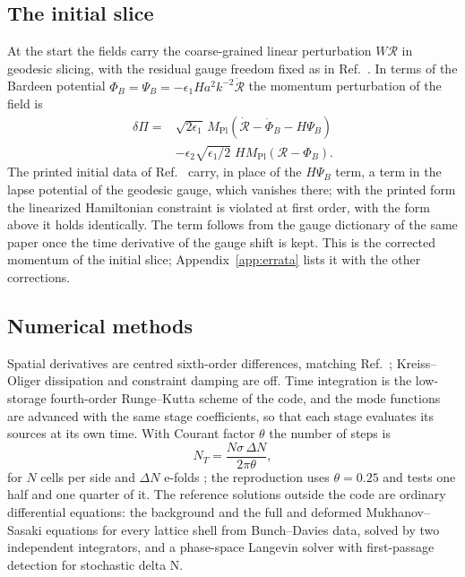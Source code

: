 \documentclass[aps,prd,twocolumn,10pt,superscriptaddress,nofootinbib,longbibliography,floatfix]{revtex4-2}
\newcommand{\Mpl}{M_\mathrm{Pl}}
\begin{document}
\subsection{The initial slice}\label{sec:slice}

At the start the fields carry the coarse-grained linear perturbation $W\mathcal{R}$ in geodesic slicing, with the residual gauge freedom fixed as in Ref.~\cite{Launay:2025bd}. In terms of the Bardeen potential $\Phi_B=\Psi_B=-\epsilon_1Ha^2k^{-2}\dot{\mathcal{R}}$ the momentum perturbation of the field is
\begin{equation}\label{eq:dPi}
\begin{split}
\delta\Pi={}&\sqrt{2\epsilon_1}\,\Mpl\left(\dot{\mathcal{R}}-\dot\Phi_B-H\Psi_B\right)\\
&-\epsilon_2\sqrt{\epsilon_1/2}\;H\Mpl\left(\mathcal{R}-\Phi_B\right).
\end{split}
\end{equation}
The printed initial data of Ref.~\cite{Launay:2025bd} carry, in place of the $H\Psi_B$ term, a term in the lapse potential of the geodesic gauge, which vanishes there; with the printed form the linearized Hamiltonian constraint is violated at first order, with the form above it holds identically. The term follows from the gauge dictionary of the same paper once the time derivative of the gauge shift is kept. This is the corrected momentum of the initial slice; Appendix~\ref{app:errata} lists it with the other corrections.

\subsection{Numerical methods}\label{sec:methods}

Spatial derivatives are centred sixth-order differences, matching Ref.~\cite{Launay:2025sinr}; Kreiss--Oliger dissipation and constraint damping are off. Time integration is the low-storage fourth-order Runge--Kutta scheme of the code, and the mode functions are advanced with the same stage coefficients, so that each stage evaluates its sources at its own time. With Courant factor $\theta$ the number of steps is
\begin{equation}\label{eq:steps}
N_T=\frac{N\sigma\,\Delta N}{2\pi\theta},
\end{equation}
for $N$ cells per side and $\Delta N$ e-folds \cite{Launay:2025sinr}; the reproduction uses $\theta=0.25$ and tests one half and one quarter of it. The reference solutions outside the code are ordinary differential equations: the background and the full and deformed Mukhanov--Sasaki equations for every lattice shell from Bunch--Davies data, solved by two independent integrators, and a phase-space Langevin solver with first-passage detection for stochastic delta N.
\end{document}
